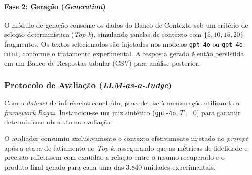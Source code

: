 \paragraph{Fase 2: Geração (\textit{Generation})}
O módulo de geração consome os dados do Banco de Contexto sob um critério de seleção determinística (\textit{Top-k}), simulando janelas de contexto com $\{5, 10, 15, 20\}$ fragmentos.  Os textos selecionados são injetados nos modelos \texttt{gpt-4o} ou \texttt{gpt-4o-mini}, conforme o tratamento experimental. A resposta gerada é então persistida em um Banco de Respostas tabular (CSV) para análise posterior.

\subsubsection{Protocolo de Avaliação (\textit{LLM-as-a-Judge})}

Com o \textit{dataset} de inferências concluído, procedeu-se à mensuração utilizando o \textit{framework Ragas}. Instanciou-se um juiz sintético (\texttt{gpt-4o}, $T=0$) para garantir determinismo absoluto na avaliação.

O avaliador consumiu exclusivamente o contexto efetivamente injetado no \textit{prompt} após a etapa de fatiamento do \textit{Top-k}, assegurando que as métricas de fidelidade e precisão refletissem com exatidão a relação entre o insumo recuperado e o produto final gerado para cada uma das 3.840 unidades experimentais.
